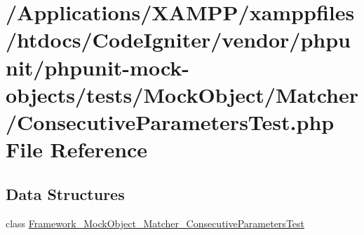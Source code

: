 \hypertarget{_consecutive_parameters_test_8php}{}\section{/\+Applications/\+X\+A\+M\+P\+P/xamppfiles/htdocs/\+Code\+Igniter/vendor/phpunit/phpunit-\/mock-\/objects/tests/\+Mock\+Object/\+Matcher/\+Consecutive\+Parameters\+Test.php File Reference}
\label{_consecutive_parameters_test_8php}
\subsection*{Data Structures}
\begin{DoxyCompactItemize}
\item 
class \mbox{\hyperlink{class_framework___mock_object___matcher___consecutive_parameters_test}{Framework\+\_\+\+Mock\+Object\+\_\+\+Matcher\+\_\+\+Consecutive\+Parameters\+Test}}
\end{DoxyCompactItemize}
